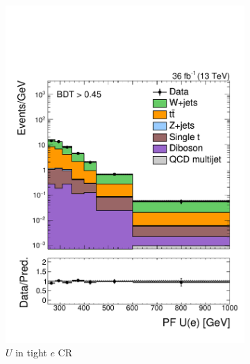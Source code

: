 \begin{figure}[]
\begin{center}
\begin{subfigure}[t]{0.32\textwidth}
            \includegraphics[width=\textwidth]{figures/monotop/prefit/singleelectronw_tight_pfUWmag_logy.pdf}
            \caption{$U$ in tight $e$ CR}
        \end{subfigure}
        \begin{subfigure}[t]{0.32\textwidth}

\end{subfigure}
\end{center}
\end{figure}
